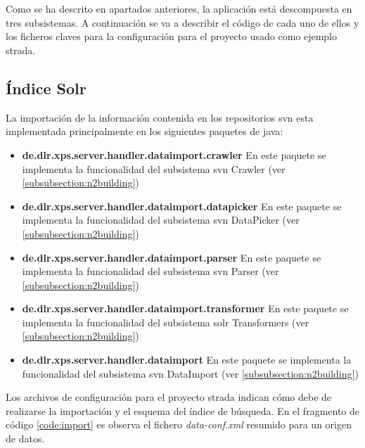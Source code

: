 \section{}
\begin{comment}
Organización del código fuente, describiendo la utilidad de los diferentes ficheros y su distribución en paquetes o directorios. Asimismo, se incluirá algún extracto significativo de código fuente que sea de interés para ilustrar algún algoritmo o funcionalidad específica del sistema.
\end{comment}

Como se ha descrito en apartados anteriores, la aplicación está descompuesta en tres subsistemas. A continuación se va a describir el código de cada uno de ellos y los ficheros  claves para la configuración para el proyecto usado como ejemplo \gls{strada}.

\subsection{Índice Solr}
La importación de la información contenida en los repositorios \gls{svn} esta implementada principalmente en los siguientes paquetes de \gls{java}:
\begin{itemize}
	\item \textbf{de.dlr.xps.server.handler.dataimport.crawler}
    En este paquete se implementa la funcionalidad del subsistema \gls{svn} Crawler
    (ver \ref{subsubsection:n2building})
    \item \textbf{de.dlr.xps.server.handler.dataimport.datapicker}
    En este paquete se implementa la funcionalidad del subsistema \gls{svn} DataPicker
    (ver \ref{subsubsection:n2building})
    \item \textbf{de.dlr.xps.server.handler.dataimport.parser}
    En este paquete se implementa la funcionalidad del subsistema \gls{svn} Parser
    (ver \ref{subsubsection:n2building})
    \item \textbf{de.dlr.xps.server.handler.dataimport.transformer}
    En este paquete se implementa la funcionalidad del subsistema \gls{solr} Transformers
    (ver \ref{subsubsection:n2building})
    \item \textbf{de.dlr.xps.server.handler.dataimport}
    En este paquete se implementa la funcionalidad del subsistema \gls{svn} DataImport
    (ver \ref{subsubsection:n2building})
\end{itemize}

Los archivos de configuración para el proyecto \gls{strada} indican cómo debe de realizarse la importación y el esquema del índice de búsqueda. En el fragmento de código \ref{code:import} es observa el fichero \textit{data-conf.xml} resumido para un origen de datos.

